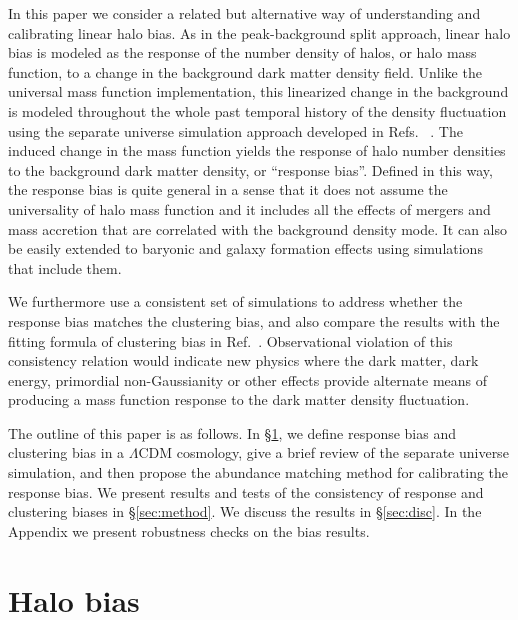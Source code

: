 \documentclass[prd,twocolumn,amsmath,amssymb,floatfix,superscriptaddress]{revtex4-1}
\begin{document}
In this paper we consider a related but alternative way of understanding and
calibrating linear halo bias. 
As in the peak-background split approach, linear halo bias is modeled as the response
of the number density of halos, or halo mass function, to a change in the background
dark matter density field.  Unlike the universal mass function implementation, this linearized change
in the background is modeled throughout the whole past temporal history of the density fluctuation using
the separate universe simulation approach developed in
Refs.~\cite{Lietal:14a,Lietal:14b} \citep[see
also][]{Sirko:05,Baldauf:2011bh,Wagneretal:15,TakadaHu:13}.   The induced change
in the mass function yields the response of halo number densities to the
background dark matter density, or ``response bias''.
Defined in this way, the response bias is quite general in a sense that it
does not assume the universality of halo mass function and it includes
all the effects of mergers and mass accretion that are correlated with
the background density mode.   It can also be easily extended to baryonic and galaxy
formation effects using simulations that include them.

We furthermore use a consistent set of simulations to address
whether the response bias matches the clustering bias, and also compare
the results with the fitting formula of clustering bias
in Ref.~\cite{Tinkeretal:10}.
Observational violation of this consistency relation would indicate new physics where
the dark matter, dark energy, primordial non-Gaussianity or other effects provide
alternate means of producing a mass function response to the dark matter density
fluctuation.

The outline of this paper is as follows. In \S\ref{sec:bias}, we define
 response bias and  clustering bias in a $\Lambda$CDM cosmology,
give a brief review of the separate universe simulation, and then
propose the abundance matching method for calibrating
the response bias. We present results and 
tests of the consistency of response and clustering biases
in \S\ref{sec:method}. We discuss the results in
\S\ref{sec:disc}.  In the Appendix we present robustness checks on the bias results.

\vfill


\section{Halo bias}
\label{sec:bias}
\end{document}
